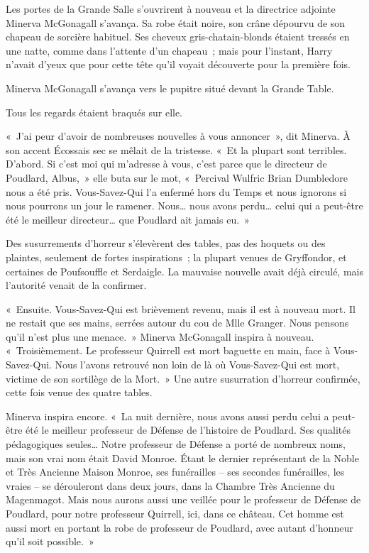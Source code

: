 Les portes de la Grande Salle s'ouvrirent à nouveau et la directrice adjointe Minerva McGonagall s'avança. Sa robe était noire, son crâne dépourvu de son chapeau de sorcière habituel. Ses cheveux gris-chatain-blonds étaient tressés en une natte, comme dans l'attente d'un chapeau~; mais pour l'instant, Harry n'avait d'yeux que pour cette tête qu'il voyait découverte pour la première fois.

Minerva McGonagall s'avança vers le pupitre situé devant la Grande Table.

Tous les regards étaient braqués sur elle.

«~J'ai peur d'avoir de nombreuses nouvelles à vous annoncer~», dit Minerva. À son accent Écossais sec se mêlait de la tristesse. «~Et la plupart sont terribles. D'abord. Si c'est moi qui m'adresse à vous, c'est parce que le directeur de Poudlard, Albus,~» elle buta sur le mot, «~Percival Wulfric Brian Dumbledore nous a été pris. Vous-Savez-Qui l'a enfermé hors du Temps et nous ignorons si nous pourrons un jour le ramener. Nous… nous avons perdu… celui qui a peut-être été le meilleur directeur… que Poudlard ait jamais eu.~»

Des susurrements d'horreur s'élevèrent des tables, pas des hoquets ou des plaintes, seulement de fortes inspirations~; la plupart venues de Gryffondor, et certaines de Poufsouffle et Serdaigle. La mauvaise nouvelle avait déjà circulé, mais l'autorité venait de la confirmer.

«~Ensuite. Vous-Savez-Qui est brièvement revenu, mais il est à nouveau mort. Il ne restait que ses mains, serrées autour du cou de Mlle Granger. Nous pensons qu'il n'est plus une menace.~» Minerva McGonagall inspira à nouveau. «~Troisièmement. Le professeur Quirrell est mort baguette en main, face à Vous-Savez-Qui. Nous l'avons retrouvé non loin de là où Vous-Savez-Qui est mort, victime de son sortilège de la Mort.~» Une autre susurration d'horreur confirmée, cette fois venue des quatre tables.

Minerva inspira encore. «~La nuit dernière, nous avons aussi perdu celui a peut-être été le meilleur professeur de Défense de l'histoire de Poudlard. Ses qualités pédagogiques seules… Notre professeur de Défense a porté de nombreux noms, mais son vrai nom était David Monroe. Étant le dernier représentant de la Noble et Très Ancienne Maison Monroe, ses funérailles -- ses secondes funérailles, les vraies -- se dérouleront dans deux jours, dans la Chambre Très Ancienne du Magenmagot. Mais nous aurons aussi une veillée pour le professeur de Défense de Poudlard, pour notre professeur Quirrell, ici, dans ce château. Cet homme est aussi mort en portant la robe de professeur de Poudlard, avec autant d'honneur qu'il soit possible.~»


